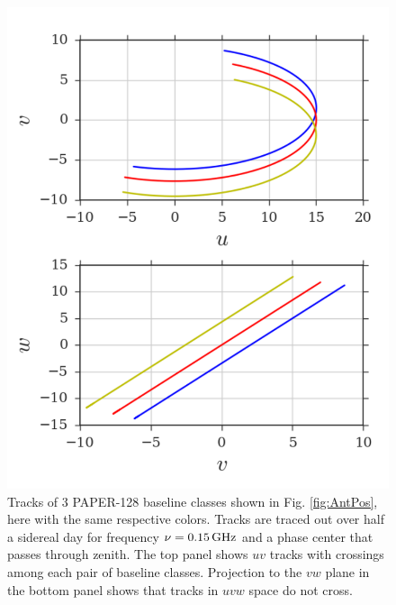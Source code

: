 \documentclass[twocolumn,apj,numberedappendix]{emulateapj}
\renewcommand\[{\begin{equation}}
\renewcommand\]{\end{equation}}
\begin{document}
\begin{figure}[h]
\includegraphics[width=\linewidth]{rotation_new}
\caption{Tracks of 3 PAPER-128 baseline classes shown in Fig. \ref{fig:AntPos}, here with the same respective colors. Tracks are traced out over half a sidereal day for frequency $\nu=0.15\text{\,GHz}$ and a phase center that passes through zenith. The top panel shows $uv$ tracks with crossings among each pair of baseline classes. Projection to the $vw$ plane in the bottom panel shows that tracks in $uvw$ space do not cross. }
\label{fig:Tracks}
\end{figure}
\end{document}
